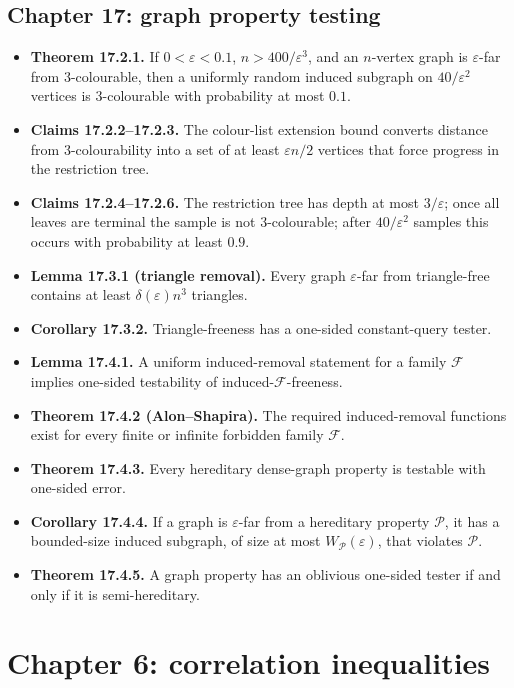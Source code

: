 \documentclass[10pt]{article}
\newcommand{\1}{\mathbf 1}
\begin{document}
\subsection*{Chapter 17: graph property testing}
\begin{itemize}
\item \textbf{Theorem 17.2.1.} If $0<\varepsilon<0.1$,
$n>400/\varepsilon^3$, and an $n$-vertex graph is
$\varepsilon$-far from $3$-colourable, then a uniformly random induced
subgraph on $40/\varepsilon^2$ vertices is $3$-colourable with probability at
most $0.1$.
\item \textbf{Claims 17.2.2--17.2.3.} The colour-list extension bound converts
distance from $3$-colourability into a set of at least $\varepsilon n/2$
vertices that force progress in the restriction tree.
\item \textbf{Claims 17.2.4--17.2.6.} The restriction tree has depth at most
$3/\varepsilon$; once all leaves are terminal the sample is not
$3$-colourable; after $40/\varepsilon^2$ samples this occurs with probability
at least $0.9$.
\item \textbf{Lemma 17.3.1 (triangle removal).} Every graph
$\varepsilon$-far from triangle-free contains at least
$\delta(\varepsilon)n^3$ triangles.
\item \textbf{Corollary 17.3.2.} Triangle-freeness has a one-sided
constant-query tester.
\item \textbf{Lemma 17.4.1.} A uniform induced-removal statement for a family
$\mathcal F$ implies one-sided testability of induced-$\mathcal F$-freeness.
\item \textbf{Theorem 17.4.2 (Alon--Shapira).} The required induced-removal
functions exist for every finite or infinite forbidden family $\mathcal F$.
\item \textbf{Theorem 17.4.3.} Every hereditary dense-graph property is
testable with one-sided error.
\item \textbf{Corollary 17.4.4.} If a graph is $\varepsilon$-far from a
hereditary property $\mathcal P$, it has a bounded-size induced subgraph, of
size at most $W_{\mathcal P}(\varepsilon)$, that violates $\mathcal P$.
\item \textbf{Theorem 17.4.5.} A graph property has an oblivious one-sided
tester if and only if it is semi-hereditary.
\end{itemize}

\endgroup

\section{Chapter 6: correlation inequalities}
\end{document}

